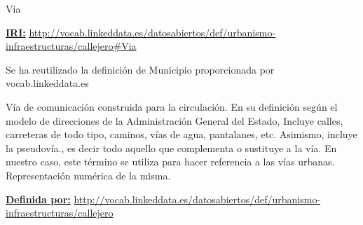 \begin{mybox}{Via}
\begin{flushleft}
\underline{\textbf{IRI:}}
\url{http://vocab.linkeddata.es/datosabiertos/def/urbanismo-infraestructuras/callejero#Via}
\newline

Se ha reutilizado la definición de Municipio proporcionada por vocab.linkeddata.es \cite{datoabiertos_idVia}

Vía de comunicación construida para la circulación. En su definición según el modelo de direcciones de la Administración General del Estado, Incluye calles, carreteras de todo tipo, caminos, vías de agua, pantalanes, etc. Asimismo, incluye la pseudovía., es decir todo aquello que complementa o sustituye a la vía. En nuestro caso, este término se utiliza para hacer referencia a las vías urbanas.
Representación numérica de la misma.
\newline

\underline{\textbf{Definida por:}}\newline
\url{http://vocab.linkeddata.es/datosabiertos/def/urbanismo-infraestructuras/callejero}
\newline





\end{flushleft}
\end{mybox}


